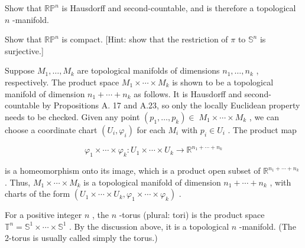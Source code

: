 \begin{exercise}
\label{exer:1-6}
\leanok
{}
Show that ${\mathbb{{RP}}}^{n}$ is Hausdorff and second-countable, and is therefore a topological $n$ -manifold.
\end{exercise}

\begin{exercise}
\label{exer:1-7}
\leanok
{}
Show that ${\mathbb{{RP}}}^{n}$ is compact. [Hint: show that the restriction of $\pi$ to ${\mathbb{S}}^{n}$ is surjective.]
\end{exercise}

\begin{example}
\label{ex:1-8}
\leanok
{}
Suppose ${M}_{1},\ldots ,{M}_{k}$ are topological manifolds of dimensions ${n}_{1},\ldots ,{n}_{k}$ , respectively. The product space ${M}_{1} \times  \cdots  \times  {M}_{k}$ is shown to be a topological manifold of dimension ${n}_{1} + \cdots  + {n}_{k}$ as follows. It is Hausdorff and second-countable by Propositions A. 17 and A.23, so only the locally Euclidean property needs to be checked. Given any point $\left( {{p}_{1},\ldots ,{p}_{k}}\right)  \in \; {M}_{1} \times  \cdots  \times  {M}_{k}$ , we can choose a coordinate chart $\left( {{U}_{i},{\varphi }_{i}}\right)$ for each ${M}_{i}$ with ${p}_{i} \in  {U}_{i}$ . The product map

\[
{\varphi }_{1} \times  \cdots  \times  {\varphi }_{k} : {U}_{1} \times  \cdots  \times  {U}_{k} \rightarrow  {\mathbb{R}}^{{n}_{1} + \cdots  + {n}_{k}}
\]

is a homeomorphism onto its image, which is a product open subset of ${\mathbb{R}}^{{n}_{1} + \cdots  + {n}_{k}}$ . Thus, ${M}_{1} \times  \cdots  \times  {M}_{k}$ is a topological manifold of dimension ${n}_{1} + \cdots  + {n}_{k}$ , with charts of the form $\left( {{U}_{1} \times  \cdots  \times  {U}_{k},{\varphi }_{1} \times  \cdots  \times  {\varphi }_{k}}\right)$ .
\end{example}

\begin{example}[Tori]
\label{ex:1-9}
\leanok
{}
For a positive integer $n$ , the $n$ -torus (plural: tori) is the product space ${\mathbb{T}}^{n} = {\mathbb{S}}^{1} \times  \cdots  \times  {\mathbb{S}}^{1}$ . By the discussion above, it is a topological $n$ -manifold. (The 2-torus is usually called simply the torus.)
\end{example}

